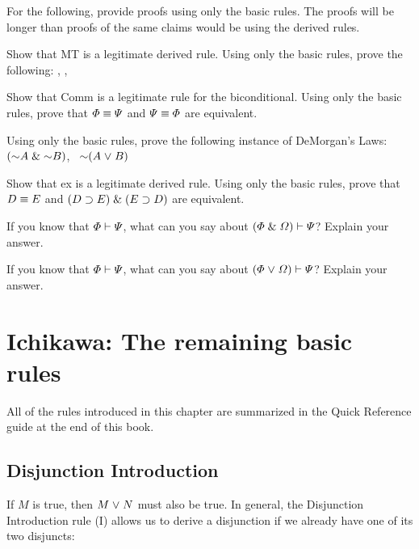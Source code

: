 \problempart
For the following, provide proofs using only the basic rules. The proofs will be longer than proofs of the same claims would be using the derived rules.
\begin{earg}
\item Show that MT is a legitimate derived rule. Using only the basic rules, prove the following: \metaA{}\eif\metaB{}, \enot\metaB{}, \therefore\ \enot\metaA{}
\item Show that Comm is a legitimate rule for the biconditional. Using only the basic rules, prove that $\varPhi{}\equiv\varPsi{}$ and $\varPsi{}\equiv\varPhi{}$ are equivalent.
\item Using only the basic rules, prove the following instance of DeMorgan's Laws: $(\enot A \eand \enot B)$, \therefore\ $\enot(A \eor B)$
\item Show that {\eiff}{ex} is a legitimate derived rule. Using only the basic rules, prove that $D\equiv E$ and $(D\supset E)\mathrel\&(E\supset D)$ are equivalent.
\end{earg}




\problempart
\begin{earg}
\item If you know that $\varPhi{}\vdash\varPsi{}$, what can you say about $(\varPhi{}\mathrel\&\varOmega{})\vdash\varPsi{}$? Explain your answer.
\item If you know that $\varPhi{}\vdash\varPsi{}$, what can you say about $(\varPhi{}\mkern1mu\vee\mkern1mu\varOmega{})\vdash\varPsi{}$? Explain your answer.
\end{earg}

\fi




\iffalse 

\section{Ichikawa: The remaining basic rules}

All of the rules introduced in this chapter are summarized in the Quick Reference guide at the end of this book.

\subsection{Disjunction Introduction}
If $M$ is true, then $M \mkern1mu\vee\mkern1mu N$ must also be true. In general, the Disjunction Introduction rule ({\eor}I) allows us to derive a disjunction if we already have one of its two disjuncts:

